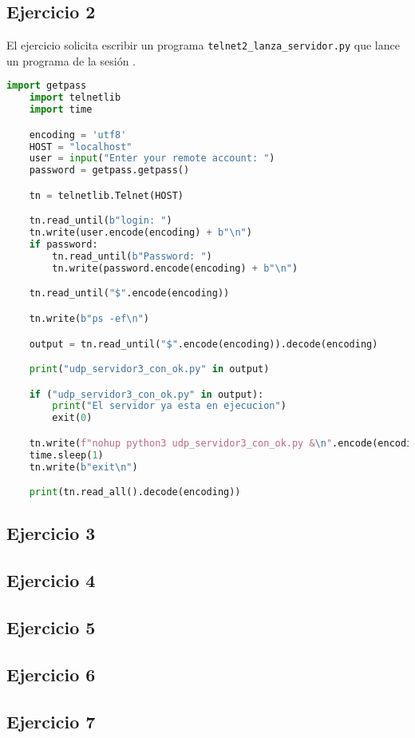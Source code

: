 \subsection{Ejercicio 2}

El ejercicio solicita escribir un programa \lstinline{telnet2_lanza_servidor.py}
que lance un programa de la sesión .

\begin{lstlisting}[language=Python]
    import getpass
    import telnetlib
    import time

    encoding = 'utf8'
    HOST = "localhost"
    user = input("Enter your remote account: ")
    password = getpass.getpass()

    tn = telnetlib.Telnet(HOST)

    tn.read_until(b"login: ")
    tn.write(user.encode(encoding) + b"\n")
    if password:
        tn.read_until(b"Password: ")
        tn.write(password.encode(encoding) + b"\n")

    tn.read_until("$".encode(encoding))

    tn.write(b"ps -ef\n")

    output = tn.read_until("$".encode(encoding)).decode(encoding)

    print("udp_servidor3_con_ok.py" in output)

    if ("udp_servidor3_con_ok.py" in output):
        print("El servidor ya esta en ejecucion")
        exit(0)

    tn.write(f"nohup python3 udp_servidor3_con_ok.py &\n".encode(encoding))
    time.sleep(1)
    tn.write(b"exit\n")

    print(tn.read_all().decode(encoding))
\end{lstlisting}

\subsection{Ejercicio 3}
\subsection{Ejercicio 4}
\subsection{Ejercicio 5}
\subsection{Ejercicio 6}
\subsection{Ejercicio 7}
